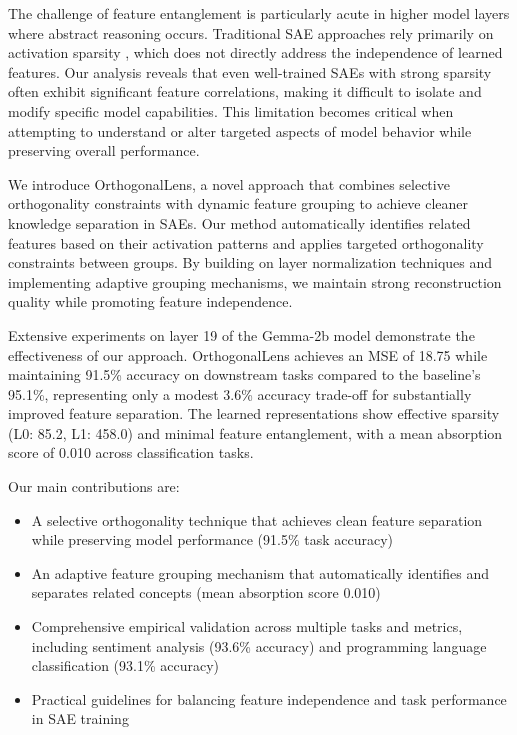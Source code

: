 \documentclass{article} %
\begin{document}
The challenge of feature entanglement is particularly acute in higher model layers where abstract reasoning occurs. Traditional SAE approaches rely primarily on activation sparsity \cite{kingma2014adam}, which does not directly address the independence of learned features. Our analysis reveals that even well-trained SAEs with strong sparsity often exhibit significant feature correlations, making it difficult to isolate and modify specific model capabilities. This limitation becomes critical when attempting to understand or alter targeted aspects of model behavior while preserving overall performance.

We introduce OrthogonalLens, a novel approach that combines selective orthogonality constraints with dynamic feature grouping to achieve cleaner knowledge separation in SAEs. Our method automatically identifies related features based on their activation patterns and applies targeted orthogonality constraints between groups. By building on layer normalization techniques \cite{ba2016layer} and implementing adaptive grouping mechanisms, we maintain strong reconstruction quality while promoting feature independence.

Extensive experiments on layer 19 of the Gemma-2b model demonstrate the effectiveness of our approach. OrthogonalLens achieves an MSE of 18.75 while maintaining 91.5\% accuracy on downstream tasks compared to the baseline's 95.1\%, representing only a modest 3.6\% accuracy trade-off for substantially improved feature separation. The learned representations show effective sparsity (L0: 85.2, L1: 458.0) and minimal feature entanglement, with a mean absorption score of 0.010 across classification tasks.

Our main contributions are:
\begin{itemize}
    \item A selective orthogonality technique that achieves clean feature separation while preserving model performance (91.5\% task accuracy)
    \item An adaptive feature grouping mechanism that automatically identifies and separates related concepts (mean absorption score 0.010)
    \item Comprehensive empirical validation across multiple tasks and metrics, including sentiment analysis (93.6\% accuracy) and programming language classification (93.1\% accuracy)
    \item Practical guidelines for balancing feature independence and task performance in SAE training
\end{itemize}
\end{document}
